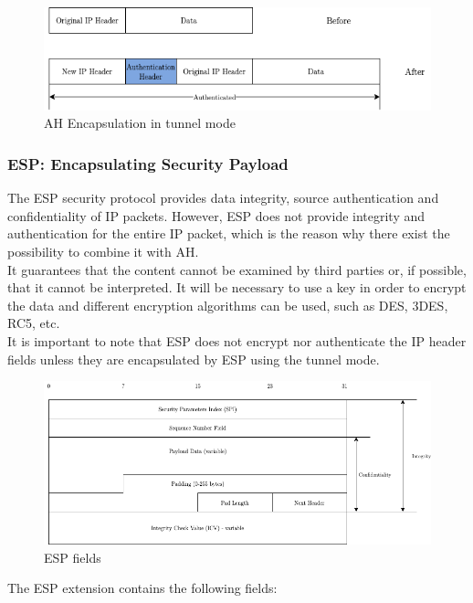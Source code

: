 \documentclass[11pt]{book}
\begin{document}
\begin{figure}[H]
	\centering
	\includegraphics [scale=0.6] {ah-tunnel.png}
	\caption{AH Encapsulation in tunnel mode}
\end{figure}

\subsubsection{ESP: Encapsulating Security Payload}
The ESP security protocol provides data integrity, source authentication and confidentiality of IP packets. However, ESP does not provide integrity and authentication for the entire IP packet, which is the reason why there exist the possibility to combine it with AH.\\
It guarantees that the content cannot be examined by third parties or, if possible, that it cannot be interpreted. It will be necessary to use a key in order to encrypt the data and different encryption algorithms can be used, such as DES, 3DES, RC5, etc. \\
It is important to note that ESP does not encrypt nor authenticate the IP header fields unless they are encapsulated by ESP using the tunnel mode. 
\begin{figure}[H]
	\centering
	\includegraphics [scale=0.5] {esp_header.png}
	\caption{ESP fields}
\end{figure}
The ESP extension contains the following fields:
\end{document}

